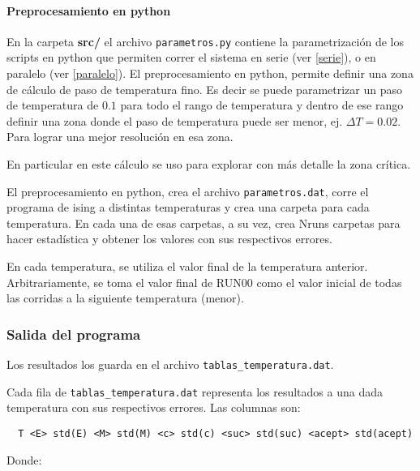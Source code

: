 \paragraph{Preprocesamiento en python}

En la carpeta \textbf{src/} el archivo \texttt{parametros.py} contiene la 
parametrizaci\'on de los scripts en python que permiten correr el sistema en 
serie (ver \eqref{serie}), 
o en paralelo (ver \eqref{paralelo}).
El preprocesamiento en python, permite definir una zona de c\'alculo de paso
de temperatura fino. Es decir se puede parametrizar un paso de temperatura de
$0.1$ para todo el rango de temperatura y dentro de ese rango definir una zona
donde el paso de temperatura puede ser menor, ej. $\Delta T = 0.02$. Para 
lograr una mejor resoluci\'on
en esa zona.

En particular en este c\'alculo se uso para explorar con m\'as detalle la zona
cr\'itica.

El preprocesamiento en python, crea el archivo \texttt{parametros.dat}, 
 corre el programa de ising a distintas temperaturas y crea una carpeta para 
 cada temperatura. En cada una de esas carpetas, a su vez, crea Nruns carpetas 
 para hacer estadística y obtener los valores con sus respectivos errores.
 
  En cada temperatura, se utiliza el valor final de la temperatura anterior.
  Arbitrariamente, se toma el valor final de RUN00 como el valor inicial de
  todas las corridas a la siguiente temperatura (menor).
 

\subsubsection{Salida del programa}

Los resultados los guarda en el archivo \texttt{tablas\_temperatura.dat}.

Cada fila de \texttt{tablas\_temperatura.dat} representa los resultados a una 
dada temperatura con sus respectivos errores. Las columnas son:

\begin{verbatim}
  T <E> std(E) <M> std(M) <c> std(c) <suc> std(suc) <acept> std(acept)
\end{verbatim}

Donde:



